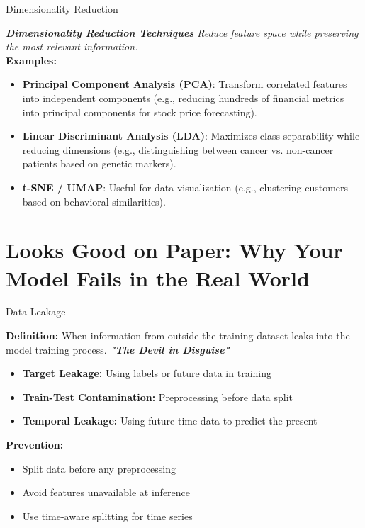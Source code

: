 \documentclass{beamer}
\begin{document}
\begin{frame}{Dimensionality Reduction}
  
    \textit{\textbf{Dimensionality Reduction Techniques} Reduce feature space while preserving the most relevant information.}\\
    \textbf{Examples:}  
    \begin{itemize}
        \item \textbf{Principal Component Analysis (PCA)}: Transform correlated features into independent components (e.g., reducing hundreds of financial metrics into principal components for stock price forecasting).
        \item \textbf{Linear Discriminant Analysis (LDA)}: Maximizes class separability while reducing dimensions (e.g., distinguishing between cancer vs. non-cancer patients based on genetic markers).
        \item \textbf{t-SNE / UMAP}: Useful for data visualization (e.g., clustering customers based on behavioral similarities).
    \end{itemize}
\end{frame}

\section{Looks Good on Paper: Why Your Model Fails in the Real World }


\begin{frame}{Data Leakage}

\textbf{Definition:} When information from outside the training dataset leaks into the model training process.
\textit{\textbf{"The Devil in Disguise"}}
\begin{itemize}
    \item \textbf{Target Leakage:} Using labels or future data in training
    \item \textbf{Train-Test Contamination:} Preprocessing before data split
    \item \textbf{Temporal Leakage:} Using future time data to predict the present
\end{itemize}

\textbf{Prevention:}
\begin{itemize}
    \item Split data before any preprocessing
    \item Avoid features unavailable at inference
    \item Use time-aware splitting for time series
\end{itemize}
\end{frame}
\end{document}
